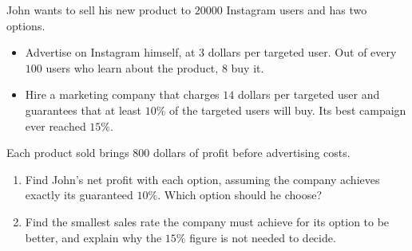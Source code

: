 John wants to sell his new product to $20000$ Instagram users and has two options.
\begin{itemize}
\item Advertise on Instagram himself, at $3$ dollars per targeted user. Out of every $100$ users who learn about the product, $8$ buy it.
\item Hire a marketing company that charges $14$ dollars per targeted user and guarantees that at least $10\%$ of the targeted users will buy. Its best campaign ever reached $15\%$.
\end{itemize}
Each product sold brings $800$ dollars of profit before advertising costs.
\begin{enumerate}
\item[(a)] Find John's net profit with each option, assuming the company achieves exactly its guaranteed $10\%$. Which option should he choose?
\item[(b)] Find the smallest sales rate the company must achieve for its option to be better, and explain why the $15\%$ figure is not needed to decide.
\end{enumerate}
